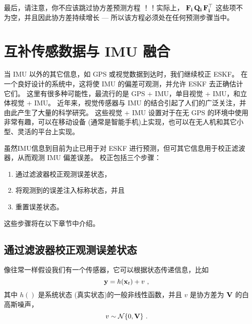 最后，请注意，你不应该跳过协方差预测方程 ！！实际上， ${\bf F}_{\bf i}\,{\bf Q}_{\bf i}\,{\bf F}_{\bf i}^{\top}$ 这些项不为空，并且因此协方差持续增长 --- 所以该方程必须处在任何预测步骤当中。


\section{互补传感数据与 IMU 融合}
\label{sec:fusion}

当 IMU 以外的其它信息，如 GPS 或视觉数据到达时，我们继续校正 ESKF。
在一个良好设计的系统中，这将使 IMU 的偏差可观测，并允许 ESKF 去正确估计它们。 
这里有很多种可能性，最流行的是 GPS + IMU，单目视觉 + IMU，和立体视觉 + IMU。 
近年来，视觉传感器与 IMU 的结合引起了人们的广泛关注，并由此产生了大量的科学研究。 
这些视觉 + IMU 设置对于在无 GPS 的环境中使用非常有趣，可以在移动设备 (通常是智能手机)上实现，也可以在无人机和其它小型、灵活的平台上实现。

\bigskip

虽然IMU信息到目前为止已用于对 ESKF 进行预测，但可其它信息用于校正滤波器，从而观测 IMU 偏差误差。 
校正包括三个步骤：
\begin{enumerate}
\item
 通过滤波器校正观测误差状态， 
\item
 将观测到的误差注入标称状态，并且
\item	
 重置误差状态。 
\end{enumerate}%
%
这些步骤将在以下章节中介绍。

\subsection{通过滤波器校正观测误差状态}

像往常一样假设我们有一个传感器，它可以根据状态传递信息，比如
%
\begin{equation}
{\bf y} = h({\bf x}_t) + v~,
\end{equation}
%
其中 $h()$ 是系统状态 (真实状态)的一般非线性函数，并且 $v$ 是协方差为 ${\bf V}$ 的白高斯噪声，
%
\begin{equation}
v\sim\mathcal{N}\{0,{\bf V}\}~.
\end{equation}

